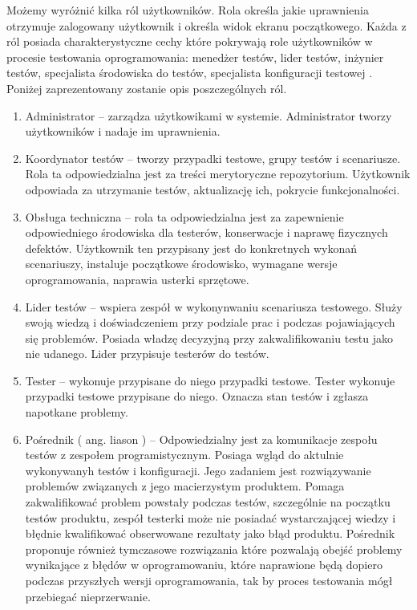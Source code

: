 Możemy wyróżnić kilka ról użytkowników. Rola określa jakie uprawnienia otrzymuje zalogowany użytkownik i określa widok ekranu początkowego. Każda z ról posiada charakterystyczne cechy które pokrywają role użytkowników w procesie testowania oprogramowania: menedżer testów, lider testów, inżynier testów, specjalista środowiska do testów, specjalista konfiguracji testowej \cite{peopleWare}. Poniżej zaprezentowany zostanie opis poszczególnych ról.
\begin{enumerate}
  \item Administrator --  zarządza użytkowikami w systemie. Administrator tworzy użytkowników i nadaje im uprawnienia.
  \item Koordynator testów -- tworzy przypadki testowe, grupy testów i scenariusze. Rola ta odpowiedzialna jest za treści merytoryczne repozytorium. Użytkownik odpowiada za utrzymanie testów, aktualizację ich, pokrycie funkcjonalności. 
  \item Obsługa techniczna -- rola ta odpowiedzialna jest za zapewnienie odpowiedniego środowiska dla testerów, konserwacje i naprawę fizycznych defektów. Użytkownik ten przypisany jest do konkretnych wykonań scenariuszy, instaluje początkowe środowisko, wymagane wersje oprogramowania, naprawia usterki sprzętowe.
  \item Lider testów -- wspiera zespół w wykonynwaniu scenariusza testowego. Służy swoją wiedzą i doświadczeniem przy podziale prac i podczas pojawiających się problemów. Posiada władzę decyzyjną przy zakwalifikowaniu testu jako nie udanego. Lider przypisuje testerów do testów.
  \item Tester --  wykonuje przypisane do niego przypadki testowe. Tester wykonuje przypadki testowe przypisane do niego. Oznacza stan testów i zgłasza napotkane problemy.
  \item Pośrednik ( ang. liason ) --  Odpowiedzialny jest za komunikacje zespołu testów z zespołem programistycznym. Posiaga wgląd do aktulnie wykonywanyh testów i konfiguracji. Jego zadaniem jest rozwiązywanie problemów związanych z jego macierzystym produktem. Pomaga zakwalifikować problem powstały podczas testów, szczególnie na początku testów produktu, zespół testerki może nie posiadać wystarczającej wiedzy i błędnie kwalifikować obserwowane rezultaty jako błąd produktu. Pośrednik proponuje również tymczasowe rozwiązania które pozwalają obejść problemy wynikające z błędów w oprogramowaniu, które naprawione będą dopiero podczas przyszłych wersji oprogramowania, tak by proces testowania mógł przebiegać nieprzerwanie.


\end{enumerate}
